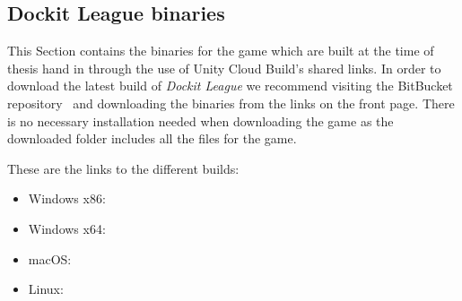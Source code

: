 \subsection{Dockit League binaries}
This Section contains the binaries for the game which are built at the time of thesis hand in through the use of Unity Cloud Build's shared links. In order to download the latest build of \emph{Dockit League} we recommend visiting the BitBucket repository~\cite{bitbucketRepo} and downloading the binaries from the links on the front page. There is no necessary installation needed when downloading the game as the downloaded folder includes all the files for the game. 

These are the links to the different builds:
\begin{itemize}
    \item Windows x86:  \cite{x86build}
    \item Windows x64:  \cite{x64build}
    \item macOS:  \cite{macOSbuild}
    \item Linux:  \cite{linuxbuild}
\end{itemize}